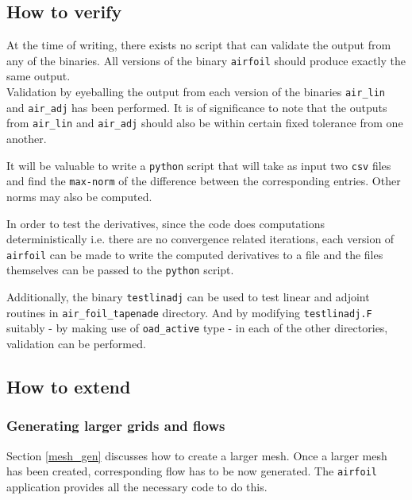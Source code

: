 \subsection{How to verify}
At the time of writing, there exists no script that can validate the output from any of the binaries. All versions of the binary \texttt{airfoil} should produce exactly the same output.\\

\noindent Validation by eyeballing the output from each version of the binaries \texttt{air\_lin} and  \texttt{air\_adj} has been performed. It is of significance to note that the outputs from \texttt{air\_lin} and  \texttt{air\_adj} should also be within certain fixed tolerance from one another.

\begin{TodoPar}
\noindent It will be valuable to write a \texttt{python} script that will take as input two \texttt{csv} files and find the \texttt{max-norm} of the difference between the corresponding entries. Other norms may also be computed. 
\end{TodoPar}

\noindent In order to test the derivatives, since the code does computations deterministically i.e. there are no convergence related iterations, each version of \texttt{airfoil} can be made to write the computed derivatives to a file and the files themselves can be passed to the \texttt{python} script.\\

\begin{TodoPar}
\noindent Additionally, the binary \texttt{testlinadj} can be used to test linear and adjoint routines in \texttt{air\_foil\_tapenade} directory. And by modifying \texttt{testlinadj.F} suitably - by making use of \texttt{oad\_active} type - in each of the other directories, validation can be performed.
\end{TodoPar}
\subsection{How to extend}
\subsubsection{Generating larger grids and flows}
Section \ref{mesh_gen} discusses how to create a larger mesh. Once a larger mesh has been created, corresponding flow has to be now generated. The \texttt{airfoil} application provides all the necessary code to do this. \\

